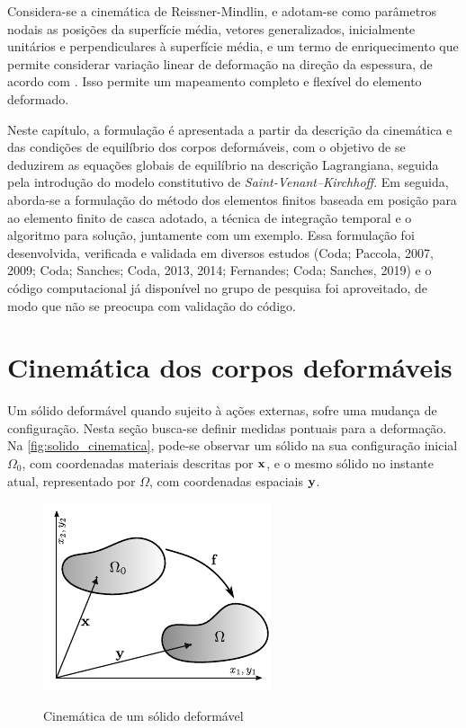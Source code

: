 Considera-se a cinemática de Reissner-Mindlin, e adotam-se como parâmetros nodais as posições da superfície média, vetores generalizados, inicialmente unitários e perpendiculares à superfície média, e um termo de enriquecimento que permite considerar variação linear de deformação na direção da espessura, de acordo com . Isso permite um mapeamento completo e flexível do elemento deformado. 

Neste capítulo, a formulação é apresentada a partir da descrição da cinemática e das condições de equilíbrio dos corpos deformáveis, com o objetivo de se deduzirem as equações globais de equilíbrio na descrição Lagrangiana, seguida pela introdução do modelo constitutivo de \textit{Saint-Venant–Kirchhoff}. Em seguida, aborda-se a formulação do método dos elementos finitos baseada em posição para ao elemento finito de casca adotado, a técnica de integração temporal e o algoritmo para solução, juntamente com um exemplo. Essa formulação foi desenvolvida, verificada e validada em diversos estudos (Coda; Paccola,
2007, 2009; Coda; Sanches; Coda, 2013, 2014; Fernandes; Coda;
Sanches, 2019) e o código computacional já disponível no grupo de pesquisa foi aproveitado, de modo que não se preocupa com validação do código. 

\section{Cinemática dos corpos deformáveis}

Um sólido deformável quando sujeito à ações externas, sofre uma mudança de configuração. Nesta seção busca-se definir medidas pontuais para a deformação. Na \autoref{fig:solido_cinematica}, pode-se observar um sólido na sua configuração inicial $\Omega_{0}$, com coordenadas materiais descritas por $\mathbf{x}$, e o mesmo sólido no instante atual, representado por $\Omega$, com coordenadas espaciais $\mathbf{y}$. 

\begin{figure}[!htbp]
	\caption{Cinemática de um sólido deformável}
	\centering
	\includegraphics[scale=1.7]{Imagens/Cap4/sol_cinematica.pdf}	
	\label{fig:solido_cinematica}
\end{figure}

